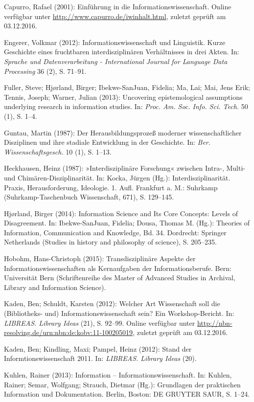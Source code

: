 \documentclass[a4paper,
fontsize=11pt,
oneside,
numbers=noperiodatend,
parskip=half-,
bibliography=totoc,
final
]{scrartcl}
\begin{document}
Capurro, Rafael (2001): Einführung in die Informationswissenschaft.
Online verfügbar unter \url{http://www.capurro.de/iwinhalt.html},
zuletzt geprüft am 03.12.2016.

Engerer, Volkmar (2012): Informationswissenschaft und Linguistik. Kurze
Geschichte eines fruchtbaren interdisziplinären Verhältnisses in drei
Akten. In: \emph{Sprache und Datenverarbeitung - International Journal
for Language Data Processing} 36 (2), S. 71--91.

Fuller, Steve; Hjørland, Birger; Ibekwe-SanJuan, Fidelia; Ma, Lai; Mai,
Jens Erik; Tennis, Joseph; Warner, Julian (2013): Uncovering
epistemological assumptions underlying research in information studies.
In: \emph{Proc. Am. Soc. Info. Sci. Tech.} 50 (1), S. 1--4.

Guntau, Martin (1987): Der Herausbildungsprozeß moderner
wissenschaftlicher Disziplinen und ihre stadiale Entwicklung in der
Geschichte. In: \emph{Ber. Wissenschaftsgesch.} 10 (1), S. 1--13.

Heckhausen, Heinz (1987): »Interdisziplinäre Forschung« zwischen Intra-,
Multi- und Chimären-Disziplinarität. In: Kocka, Jürgen (Hg.):
Interdisziplinarität. Praxis, Herausforderung, Ideologie. 1. Aufl.
Frankfurt a. M.: Suhrkamp (Suhrkamp-Taschenbuch Wissenschaft, 671), S.
129--145.

Hjørland, Birger (2014): Information Science and Its Core Concepts:
Levels of Disagreement. In: Ibekwe-SanJuan, Fidelia; Dousa, Thomas M.
(Hg.): Theories of Information, Communication and Knowledge, Bd. 34.
Dordrecht: Springer Netherlands (Studies in history and philosophy of
science), S. 205--235.

Hobohm, Hans-Christoph (2015): Transdisziplinäre Aspekte der
Informationswissenschaften als Kernaufgaben der Informationsberufe.
Bern: Universität Bern (Schriftenreihe des Master of Advanced Studies in
Archival, Library and Information Science).

Kaden, Ben; Schuldt, Karsten (2012): Welcher Art Wissenschaft soll die
(Bibliotheks- und) Informationswissenschaft sein? Ein Workshop-Bericht.
In: \emph{LIBREAS. Library Ideas} (21), S. 92--99. Online verfügbar
unter \url{http://nbn-resolving.de/urn:nbn:de:kobv:11-100205019},
zuletzt geprüft am 03.12.2016.

Kaden, Ben; Kindling, Maxi; Pampel, Heinz (2012): Stand der
Informtionswissenschaft 2011. In: \emph{LIBREAS. Library Ideas} (20).

Kuhlen, Rainer (2013): Information -- Informationswissenschaft. In:
Kuhlen, Rainer; Semar, Wolfgang; Strauch, Dietmar (Hg.): Grundlagen der
praktischen Information und Dokumentation. Berlin, Boston: DE GRUYTER
SAUR, S. 1--24.
\end{document}
